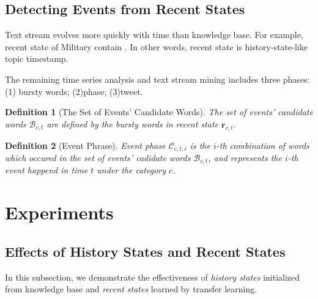 \documentclass{article}
\newtheorem{rmk}{Definition}%
\begin{document}
\subsection{Detecting Events from Recent States}
\label{subsec:detection}
Text stream evolves more quickly with time than knowledge base.
For example, recent state of Military contain .
In other words, recent state is history-state-like topic timestamp.%

The remaining time series analysis and text stream mining includes three phases: (1) bursty words; (2)phase; (3)tweet.
\begin{rmk}[The Set of Events' Candidate Words] 
The set of events' candidate words \(\mathcal{B}_{c,t}\) are defined by the bursty words in recent state \(\bm{r}_{c,t}\).
\end{rmk}

\begin{rmk}[Event Phrase] 
Event phase \(\mathcal{C}_{c,t,i}\) is the \(i\)-th combination of words which occured in the set of events' cadidate words \(\mathcal{B}_{c,t}\), and represents the \(i\)-th event happend in time \(t\) under the category \(c\).
\end{rmk}

\section{Experiments}
\subsection{Effects of History States and Recent States}
In this subsection, we demonstrate the effectiveness of \textit{history states} initialized from knowledge base and \textit{recent states} learned by transfer learning. 
\end{document}
